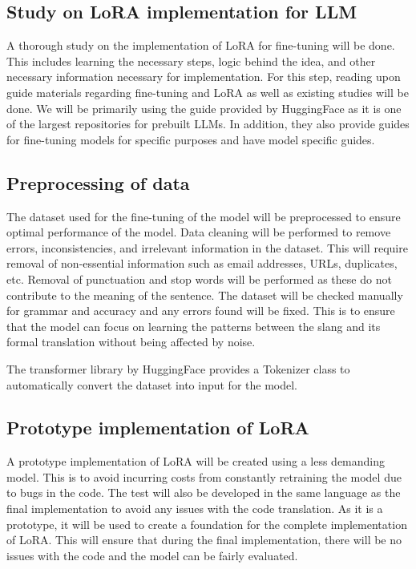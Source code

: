 \subsection{Study on LoRA implementation for LLM}
A thorough study on the implementation of LoRA for fine-tuning will be done.
This includes learning the necessary steps, logic behind the idea, and other necessary information necessary for implementation.
For this step, reading upon guide materials regarding fine-tuning and LoRA as well as existing studies will be done.
We will be primarily using the guide provided by HuggingFace as it is one of the largest repositories for prebuilt LLMs.
In addition, they also provide guides for fine-tuning models for specific purposes and have model specific guides.

\subsection{Preprocessing of data} 
The dataset used for the fine-tuning of the model will be preprocessed to ensure optimal performance of the model.
Data cleaning will be performed to remove errors, inconsistencies, and irrelevant information in the dataset.
This will require removal of non-essential information such as email addresses, URLs, duplicates, etc.
Removal of punctuation and stop words will be performed as these do not contribute to the meaning of the sentence.
The dataset will be checked manually for grammar and accuracy and any errors found will be fixed. 
This is to ensure that the model can focus on learning the patterns between the slang and its formal translation without being affected by noise.

The transformer library by HuggingFace provides a Tokenizer class to automatically convert the dataset into input for the model.

\subsection{Prototype implementation of LoRA}
A prototype implementation of LoRA will be created using a less demanding model.
This is to avoid incurring costs from constantly retraining the model due to bugs in the code.
The test will also be developed in the same language as the final implementation to avoid any issues with the code translation.
As it is a prototype, it will be used to create a foundation for the complete implementation of LoRA.
This will ensure that during the final implementation, there will be no issues with the code and the model can be fairly evaluated.

